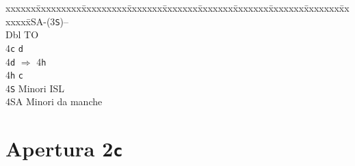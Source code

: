 \documentclass[a4paper,italian]{article}
\newcommand{\BS}{\small{\texttt{S}}}
\newcommand{\BC}{\small{\texttt{c}}}
\newcommand{\BD}{\small{\texttt{d}}}
\newcommand{\BH}{\small{\texttt{h}}}
\newcommand{\pdfc}{\texorpdfstring{\texttt{c}}{C}}
\newenvironment{bidtable}
{\begin{tabbing}

    xxxxxx\=xxxxxxxxx\=xxxxxxxxx\=xxxxxxx\=xxxxxxx\=xxxxxxx\=xxxxxxx\=xxxxxxx\=xxxxxxx\=xxxxxxx\=\kill}
{\end{tabbing} }%
\begin{document}
\begin{multicols}{2}
    \begin{bidtable}
        1\small{SA}-(3\BS)--\+\\
        Dbl \> TO\\
        4\BC \> \BD \\
        4\BD \> $\Rightarrow$ 4\BH \\
        4\BH \> \BC \\
        4\BS \> Minori ISL\\
        4\small{SA} \> Minori da manche\-
    \end{bidtable}

\end{multicols}

\newpage

\section{Apertura 2\pdfc}
\end{document}
